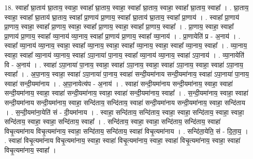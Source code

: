 \documentclass[17pt]{extarticle}
\begin{document}
18. स्वाहा᳚ घ्रा॒ताय॑ घ्रा॒ताय॒ स्वाहा॒ स्वाहा᳚ घ्रा॒ताय॒ स्वाहा॒ स्वाहा᳚ घ्रा॒ताय॒ स्वाहा॒ स्वाहा᳚ घ्रा॒ताय॒ स्वाहा᳚ । . घ्रा॒ताय॒ स्वाहा॒ स्वाहा᳚ घ्रा॒ताय॑ घ्रा॒ताय॒ स्वाहा᳚ प्रा॒णाय॑ प्रा॒णाय॒ स्वाहा᳚ घ्रा॒ताय॑ घ्रा॒ताय॒ स्वाहा᳚ प्रा॒णाय॑ । . स्वाहा᳚ प्रा॒णाय॑ प्रा॒णाय॒ स्वाहा॒ स्वाहा᳚ प्रा॒णाय॒ स्वाहा॒ स्वाहा᳚ प्रा॒णाय॒ स्वाहा॒ स्वाहा᳚ प्रा॒णाय॒ स्वाहा᳚ । . प्रा॒णाय॒ स्वाहा॒ स्वाहा᳚ प्रा॒णाय॑ प्रा॒णाय॒ स्वाहा᳚ व्या॒नाय॑ व्या॒नाय॒ स्वाहा᳚ प्रा॒णाय॑ प्रा॒णाय॒ स्वाहा᳚ व्या॒नाय॑ । . प्रा॒णायेति॑ प्र - अ॒नाय॑ । . स्वाहा᳚ व्या॒नाय॑ व्या॒नाय॒ स्वाहा॒ स्वाहा᳚ व्या॒नाय॒ स्वाहा॒ स्वाहा᳚ व्या॒नाय॒ स्वाहा॒ स्वाहा᳚ व्या॒नाय॒ स्वाहा᳚ । . व्या॒नाय॒ स्वाहा॒ स्वाहा᳚ व्या॒नाय॑ व्या॒नाय॒ स्वाहा॑ ऽपा॒नाया॑ पा॒नाय॒ स्वाहा᳚ व्या॒नाय॑ व्या॒नाय॒ स्वाहा॑ ऽपा॒नाय॑ । . व्या॒नायेति॑ वि - अ॒नाय॑ । . स्वाहा॑ ऽपा॒नाया॑ पा॒नाय॒ स्वाहा॒ स्वाहा॑ ऽपा॒नाय॒ स्वाहा॒ स्वाहा॑ ऽपा॒नाय॒ स्वाहा॒ स्वाहा॑ ऽपा॒नाय॒ स्वाहा᳚ । . अ॒पा॒नाय॒ स्वाहा॒ स्वाहा॑ ऽपा॒नाया॑ पा॒नाय॒ स्वाहा॑ सन्दी॒यमा॑नाय सन्दी॒यमा॑नाय॒ स्वाहा॑ ऽपा॒नाया॑ पा॒नाय॒ स्वाहा॑ सन्दी॒यमा॑नाय । . अ॒पा॒नायेत्य॑प - अ॒नाय॑ । . स्वाहा॑ सन्दी॒यमा॑नाय सन्दी॒यमा॑नाय॒ स्वाहा॒ स्वाहा॑ सन्दी॒यमा॑नाय॒ स्वाहा॒ स्वाहा॑ सन्दी॒यमा॑नाय॒ स्वाहा॒ स्वाहा॑ सन्दी॒यमा॑नाय॒ स्वाहा᳚ । . स॒न्दी॒यमा॑नाय॒ स्वाहा॒ स्वाहा॑ सन्दी॒यमा॑नाय सन्दी॒यमा॑नाय॒ स्वाहा॒ सन्दि॑ताय॒ सन्दि॑ताय॒ स्वाहा॑ सन्दी॒यमा॑नाय सन्दी॒यमा॑नाय॒ स्वाहा॒ सन्दि॑ताय । . स॒न्दी॒यमा॑ना॒येति॑ सं - दी॒यमा॑नाय । . स्वाहा॒ सन्दि॑ताय॒ सन्दि॑ताय॒ स्वाहा॒ स्वाहा॒ सन्दि॑ताय॒ स्वाहा॒ स्वाहा॒ सन्दि॑ताय॒ स्वाहा॒ स्वाहा॒ सन्दि॑ताय॒ स्वाहा᳚ । . सन्दि॑ताय॒ स्वाहा॒ स्वाहा॒ सन्दि॑ताय॒ सन्दि॑ताय॒ स्वाहा॑ विचृ॒त्यमा॑नाय विचृ॒त्यमा॑नाय॒ स्वाहा॒ सन्दि॑ताय॒ सन्दि॑ताय॒ स्वाहा॑ विचृ॒त्यमा॑नाय । . सन्दि॑ता॒येति॒ सं - दि॒ता॒य॒ । . स्वाहा॑ विचृ॒त्यमा॑नाय विचृ॒त्यमा॑नाय॒ स्वाहा॒ स्वाहा॑ विचृ॒त्यमा॑नाय॒ स्वाहा॒ स्वाहा॑ विचृ॒त्यमा॑नाय॒ स्वाहा॒ स्वाहा॑ विचृ॒त्यमा॑नाय॒ स्वाहा᳚ । \newline
\end{document}
